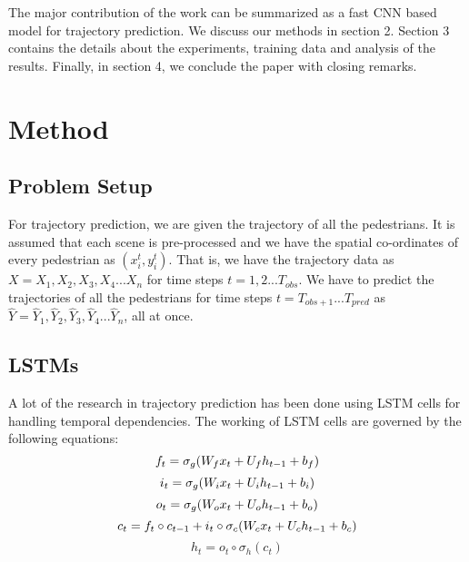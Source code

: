 \documentclass[runningheads]{llncs}
\begin{document}
The major contribution of the work can be summarized as a fast CNN based model for trajectory prediction. We discuss our methods in section 2. Section 3 contains the details about the experiments, training data and analysis of the results. Finally, in section 4, we conclude the paper with closing remarks.

\section{Method}

\subsection{Problem Setup}

For trajectory prediction, we are given the trajectory of all the pedestrians. It is assumed that each scene is pre-processed and we have the spatial co-ordinates of every pedestrian as $(x_i^t, y_i^t)$. That is, we have the trajectory data as $X = X_1, X_2, X_3, X_4 ... X_n$ for time steps $t=1,2...T_{obs}$. We have to predict the trajectories of all the pedestrians for time steps $t= T_{obs+1}...T_{pred}$ as $\hat{Y} = \hat{Y}_1, \hat{Y}_2, \hat{Y}_3, \hat{Y}_4 ... \hat{Y}_n$, all at once.


\subsection{LSTMs}

A lot of the research in trajectory prediction has been done using LSTM cells for handling temporal dependencies. The working of LSTM cells are governed by the following equations:
\begin{equation}
f_t = \sigma_g(W_{f} x_t + U_{f} h_{t-1} + b_f) \\
\end{equation}
\begin{equation}
i_t = \sigma_g(W_{i} x_t + U_{i} h_{t-1} + b_i) \\
\end{equation}
\begin{equation}
o_t = \sigma_g(W_{o} x_t + U_{o} h_{t-1} + b_o) \\
\end{equation}
\begin{equation}
c_t = f_t \circ c_{t-1} + i_t \circ \sigma_c(W_{c} x_t + U_{c} h_{t-1} + b_c) \\
\end{equation}
\begin{equation}
h_t = o_t \circ \sigma_h(c_t)
\end{equation}
\end{document}
